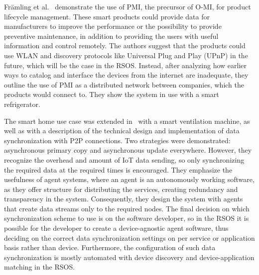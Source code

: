 Främling et al.~\cite{Gathering_Product_Data_from_Smart_Products} demonstrate the use of PMI, the precursor of O-MI, for product lifecycle management. These smart products could provide data for manufacturers to improve the performance or the possibility to provide preventive maintenance, in addition to providing the users with useful information and control remotely. The authors suggest that the products could use WLAN and discovery protocols like Universal Plug and Play (UPnP) in the future, which will be the case in the RSOS. Instead, after analyzing how earlier ways to catalog and interface the devices from the internet are inadequate, they outline the use of PMI as a distributed network between companies, which the products would connect to. They show the system in use with a smart refrigerator.

The smart home use case was extended in~\cite{P2P_Data_synchronization_for_product_lifecycle_management} with a smart ventilation machine, as well as with a description of the technical design and implementation of data synchronization with P2P connections. Two strategies were demonstrated: asynchronous primary copy and asynchronous update everywhere. However, they recognize the overhead and amount of IoT data sending, so only synchronizing the required data at the required times is encouraged. They emphasize the usefulness of agent systems, where an agent is an autonomously working software, as they offer structure for distributing the services, creating redundancy and transparency in the system. Consequently, they design the system with agents that create data streams only to the required nodes. The final decision on which synchronization scheme to use is on the software developer, so in the RSOS it is possible for the developer to create a device-agnostic agent software, thus deciding on the correct data synchronization settings on per service or application basis rather than device. Furthermore, the configuration of such data synchronization is mostly automated with device discovery and device-application matching in the RSOS.

